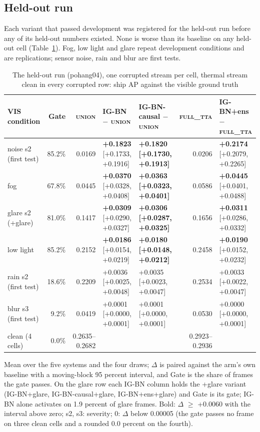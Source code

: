 \documentclass[journal]{IEEEtran}
\begin{document}
\subsection{Held-out run}\label{sec:5.2}
Each variant that passed development was registered for the held-out run before any of its held-out numbers existed. None is worse than its baseline on any held-out cell (Table~\ref{tab:3}). Fog, low light and glare repeat development conditions and are replications; sensor noise, rain and blur are first tests.

\begin{table}[!t]
\centering
\footnotesize
\caption{The held-out run (pohang04), one corrupted stream per cell, thermal stream clean in every corrupted row: ship AP against the visible ground truth}
\label{tab:3}
\setlength{\tabcolsep}{3pt}
\begin{tabularx}{\linewidth}{lrr>{\raggedright\arraybackslash}X>{\raggedright\arraybackslash}Xr>{\raggedright\arraybackslash}X}
\toprule
VIS condition & Gate & \textsc{union} & \mbox{IG-BN} $-$ \textsc{union} & \mbox{IG-BN-causal} $-$ \textsc{union} & \textsc{full\_tta} & \mbox{IG-BN+ens} $-$ \textsc{full\_tta} \\
\midrule
noise s2 (first test) & 85.2\% & 0.0169 & \textbf{+0.1823} [+0.1733, +0.1916] & \textbf{+0.1820 [+0.1730, +0.1913]} & 0.0206 & \textbf{+0.2174} [+0.2079, +0.2265] \\
fog & 67.8\% & 0.0445 & \textbf{+0.0370} [+0.0328, +0.0408] & \textbf{+0.0363 [+0.0323, +0.0401]} & 0.0586 & \textbf{+0.0445} [+0.0401, +0.0488] \\
glare s2 (+glare) & 81.0\% & 0.1417 & \textbf{+0.0309} [+0.0290, +0.0327] & \textbf{+0.0306 [+0.0287, +0.0325]} & 0.1656 & \textbf{+0.0311} [+0.0286, +0.0332] \\
low light & 85.2\% & 0.2152 & \textbf{+0.0186} [+0.0154, +0.0219] & \textbf{+0.0180 [+0.0148, +0.0212]} & 0.2458 & \textbf{+0.0190} [+0.0152, +0.0232] \\
rain s2 (first test) & 18.6\% & 0.2209 & +0.0036 [+0.0025, +0.0048] & +0.0035 [+0.0023, +0.0047] & 0.2534 & +0.0033 [+0.0022, +0.0047] \\
blur s3 (first test) & 9.2\% & 0.0419 & +0.0001 [+0.0000, +0.0001] & +0.0001 [+0.0000, +0.0001] & 0.0530 & +0.0000 [+0.0000, +0.0001] \\
clean (4 cells) & 0.0\% & 0.2635--0.2682 & 0 & 0 & 0.2923--0.2936 & 0 \\
\bottomrule
\end{tabularx}
\par\smallskip\raggedright\footnotesize Mean over the five systems and the four draws; $\Delta$ is paired against the arm's own baseline with a moving-block 95 percent interval, and Gate is the share of frames the gate passes. On the glare row each \mbox{IG-BN} column holds the +glare variant (\mbox{IG-BN+glare}, \mbox{IG-BN-causal+glare}, \mbox{IG-BN+ens+glare}) and Gate is its gate; \mbox{IG-BN} alone activates on 1.9 percent of glare frames. Bold: $\Delta$ $\geq$ +0.0060 with the interval above zero; s2, s3: severity; 0: $\Delta$ below 0.00005 (the gate passes no frame on three clean cells and a rounded 0.0 percent on the fourth).
\end{table}
\end{document}
